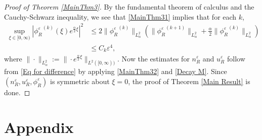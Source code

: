 \documentclass{amsart}
\newcommand{\veps}{\varepsilon}
\numberwithin{equation}{section}
\theoremstyle{plain}%
\theoremstyle{definition}
\theoremstyle{remark}
\theoremstyle{remark}
\begin{document}
\begin{proof}[Proof of Theorem \ref{MainThm3}]
By the fundamental theorem of calculus and the Cauchy-Schwarz inequality, we see that \eqref{MainThm31} implies that for each $k$,
\begin{equation}\label{MainThm32}
\begin{split}
\sup_{\xi \in [0,\infty)}|{\phi_R^\veps}^{(k)}(\xi)e^{\frac{\alpha}{2}\xi}|^2 
& \leq 2\| {\phi_R^\veps}^{(k)} \|_{L^2_\alpha}\left(\| {\phi_R^\veps}^{(k+1)}\|_{L^2_\alpha}+\frac{\alpha}{2}\| {\phi_R^\veps}^{(k)}\|_{L^2_\alpha} \right) \\
& \leq C_k \veps^4,
\end{split}
\end{equation}
where $\|\cdot\|_{L^2_\alpha}:=\|\cdot e^{\frac{\alpha}{2}\xi}\|_{L^2([0,\infty))}$. Now the estimates for $n_R^\veps$ and $u_R^\veps$ follow from \eqref{Eq for difference} by applying \eqref{MainThm32} and \eqref{Decay M}. Since $(n_R^\veps,u_R^\veps,\phi_R^\veps)$ is symmetric about $\xi=0$, the proof of Theorem \ref{Main Result} is done.


\end{proof}





\section{Appendix}
\end{document}
